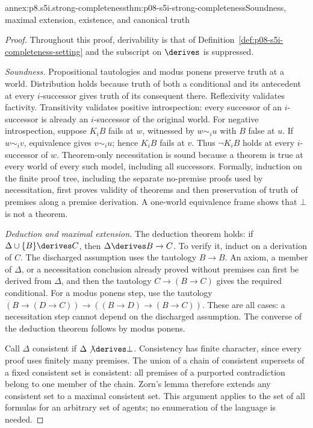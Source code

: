 \begin{annexitem}{annex:p8.s5i.strong-completeness}{thm:p08-s5i-strong-completeness}{Soundness, maximal extension, existence, and canonical truth}
\begin{proof}
Throughout this proof, derivability is that of
Definition~\ref{def:p08-s5i-completeness-setting} and the subscript on
\(\derives\) is suppressed.

\emph{Soundness.} Propositional tautologies and modus ponens preserve truth
at a world. Distribution holds because truth of both a conditional and its
antecedent at every \(i\)-successor gives truth of its consequent there.
Reflexivity validates factivity. Transitivity validates positive
introspection: every successor of an \(i\)-successor is already an
\(i\)-successor of the original world. For negative introspection,
suppose \(K_iB\) fails at \(w\), witnessed by \(w\sim_i u\) with
\(B\) false at \(u\). If \(w\sim_i v\), equivalence gives
\(v\sim_i u\); hence \(K_iB\) fails at \(v\). Thus
\(\neg K_iB\) holds at every \(i\)-successor of \(w\).
Theorem-only necessitation is sound because a theorem is true at every
world of every such model, including all successors. Formally, induction
on the finite proof tree, including the separate no-premise proofs used
by necessitation, first proves validity of theorems and then preservation
of truth of premises along a premise derivation. A one-world equivalence
frame shows that \(\bot\) is not a theorem.

\emph{Deduction and maximal extension.} The deduction theorem holds:
if \(\Delta\cup\{B\}\derives C\), then
\(\Delta\derives B\to C\). To verify it, induct on a derivation of
\(C\). The discharged assumption uses the tautology \(B\to B\).
An axiom, a member of \(\Delta\), or a necessitation conclusion already
proved without premises can first be derived from \(\Delta\), and then
the tautology \(C\to(B\to C)\) gives the required conditional.
For a modus ponens step, use the tautology
\((B\to(D\to C))\to((B\to D)\to(B\to C))\).
These are all cases: a necessitation step cannot depend on the discharged
assumption. The converse of the deduction theorem follows by modus ponens.

Call \(\Delta\) consistent if \(\Delta\not\derives\bot\).
Consistency has finite character, since every proof uses finitely many
premises. The union of a chain of consistent supersets of a fixed
consistent set is consistent: all premises of a purported contradiction
belong to one member of the chain. Zorn's lemma therefore extends any
consistent set to a maximal consistent set. This argument applies to the
set of all formulas for an arbitrary set of agents; no enumeration of the
language is needed.


\end{proof}
\end{annexitem}
